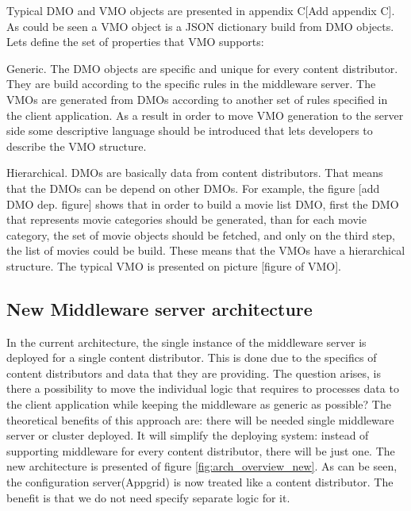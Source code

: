 Typical DMO and VMO objects are presented in appendix C[Add appendix C]. As could be seen a VMO object is a JSON dictionary build from DMO objects. Lets define the set of properties that VMO supports:

Generic. The DMO objects are specific and unique for every content distributor. They are build according to the specific rules in the middleware server. The VMOs are generated from DMOs according to another set of rules specified in the client application. As a result in order to move VMO generation to the server side some descriptive language should be introduced that lets developers to describe the VMO structure.

Hierarchical. DMOs are basically data from content distributors. That means that the DMOs can be depend on other DMOs. For example, the figure [add DMO dep. figure] shows that in order to build a movie list DMO, first the DMO that represents movie categories should be generated, than for each movie category, the set of movie objects should be fetched, and only on the third step, the list of movies could be build. These means that the VMOs have a hierarchical structure. The typical VMO is presented on picture [figure of VMO]. 

\subsection{New Middleware server architecture}

In the current architecture, the single instance of the middleware server is deployed for a single content distributor. This is done due to the specifics of content distributors and data that they are providing. The question arises, is there a possibility to move the individual logic that requires to processes data to the client application while keeping the middleware as generic as possible? The theoretical benefits of this approach are: there will be needed single middleware server or cluster deployed. It will simplify the deploying system: instead of supporting middleware for every content distributor, there will be just one. The new architecture is presented of figure \ref{fig:arch_overview_new}. As can be seen, the configuration server(Appgrid) is now treated like a content distributor. The benefit is that we do not need specify separate logic for it. 


